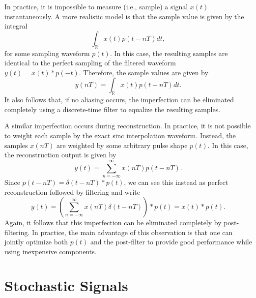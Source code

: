 In practice, it is impossible to measure (i.e., sample) a signal $x(t)$ instantaneously.
A more realistic model is that the sample value is given by the integral
\[ \int_{\mathbb{R}} x(t) p(t-nT) dt, \]
for some sampling waveform $p(t)$.
In this case, the resulting samples are identical to the perfect sampling of the filtered waveform $y(t)=x(t)*p(-t)$.
Therefore, the sample values are given by
\[ y(nT) = \int_{\mathbb{R}} x(t) p(t-nT) dt. \]
It also follows that, if no aliasing occurs, the imperfection can be eliminated completely using a discrete-time filter to equalize the resulting samples.

A similar imperfection occurs during reconstruction.
In practice, it is not possible to weight each sample by the exact sinc interpolation waveform.
Instead, the samples $x(nT)$ are weighted by some arbitrary pulse shape $p(t)$.
In this case, the reconstruction output is given by
\[ y(t) = \sum_{n=-\infty}^{\infty} x(nT) p(t-nT). \]
Since $p(t-nT) = \delta(t-nT) * p(t)$, we can see this instead as perfect reconstruction followed by filtering and write
\[ y(t) = \left( \sum_{n=-\infty}^{\infty} x(nT) \delta (t-nT) \right) * p(t) = x(t) * p(t). \]
Again, it follows that this imperfection can be eliminated completely by post-filtering.
In practice, the main advantage of this observation is that one can jointly optimize both $p(t)$ and the post-filter to provide good performance while using inexpensive components.


\section{Stochastic Signals}
\label{section:StocahsticSignalsFAS}

